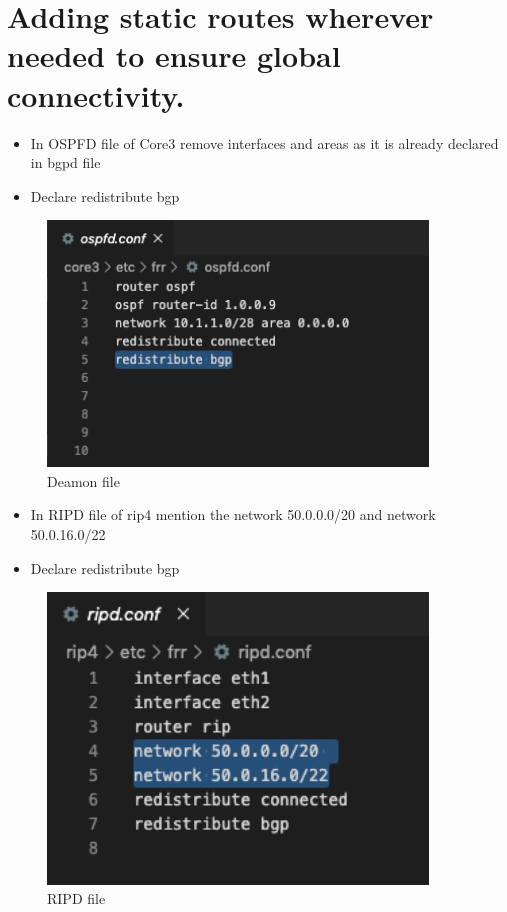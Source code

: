 \section{Adding static routes wherever needed to ensure global connectivity.}
\begin{itemize}
    \item In OSPFD file of Core3 remove interfaces and areas as it is already declared in bgpd file
    \item Declare redistribute bgp
\end{itemize}
\begin{figure}[H]
\centering
  \includegraphics[width=0.9\textwidth]{Images/ospfd.png}
  \caption{Deamon file }
  \label{fig }
\end{figure}
\begin{itemize}
    \item In RIPD file of rip4 mention the network 50.0.0.0/20 and
network 50.0.16.0/22
    \item Declare redistribute bgp
\end{itemize}
\begin{figure}[H]
\centering
  \includegraphics[width=0.9\textwidth]{Images/ripd.png}
  \caption{RIPD file }
  \label{fig }
\end{figure}
